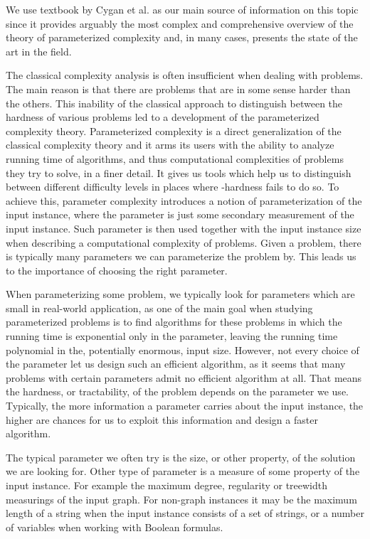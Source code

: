 We use textbook by Cygan et al. \cite{Cygan2015} as our main source of information on this topic since it
provides arguably the most complex and comprehensive overview of the theory of parameterized complexity and,
in many cases, presents the state of the art in the field.

The classical complexity analysis is often insufficient when dealing with \NPh problems.
The main reason is that there are \NPh problems that are in some sense harder than the others.
This inability of the classical approach to distinguish between the hardness of various \NPh problems
led to a development of the parameterized complexity theory.
Parameterized complexity is a direct generalization of the classical complexity theory and it arms its users
with the ability to analyze running time of algorithms, and thus computational complexities of problems
they try to solve, in a finer detail.
It gives us tools which help us to distinguish between different difficulty levels in places where
\NP-hardness fails to do so.
To achieve this, parameter complexity introduces a notion of parameterization of the input instance, where
the parameter is just some secondary measurement of the input instance.
Such parameter is then used together with the input instance size when describing a computational complexity of \NPh problems.
Given a problem, there is typically many parameters we can parameterize the problem by.
This leads us to the importance of choosing the right parameter.

When parameterizing some problem, we typically look for parameters which are small in real-world application,
as one of the main goal when studying parameterized problems is to find algorithms for these problems in which
the running time is exponential only in the parameter, leaving the running time polynomial in the, potentially enormous, input size.
However, not every choice of the parameter let us design such an efficient algorithm, as it seems that many problems with
certain parameters admit no efficient algorithm at all.
That means the hardness, or tractability, of the problem depends on the parameter we use.
Typically, the more information a parameter carries about the input instance, the higher are chances for us to exploit this
information and design a faster algorithm.

The typical parameter we often try is the size, or other property, of the solution we are looking for.
Other type of parameter is a measure of some property of the input instance.
For example the maximum degree, regularity or treewidth measurings of the input graph.
For non-graph instances it may be the maximum length of a string when the input instance consists of a set of strings,
or a number of variables when working with Boolean formulas.

